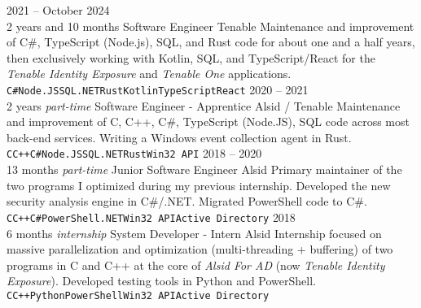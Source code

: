 \documentclass[8pt]{developercv} %
\begin{document}
\begin{entrylist}
	\entry
		{2021 -- October 2024\\\footnotesize{2 years and 10 months}}
		{Software Engineer}
		{Tenable}
		{
			Maintenance and improvement of C\#, TypeScript (Node.js), SQL, and Rust code for about one and a half years, then exclusively working with Kotlin,
			SQL, and TypeScript/React for the \emph{Tenable Identity Exposure} and \emph{Tenable One} applications.\\
			\texttt{C\#}\slashsep\texttt{Node.JS}\slashsep\texttt{SQL}\slashsep\texttt{.NET}\slashsep\texttt{Rust}\slashsep\texttt{Kotlin}\slashsep\texttt{TypeScript}\slashsep\texttt{React}
		}
	\entry
		{2020 -- 2021\\\footnotesize{2 years \emph{part-time}}}
		{Software Engineer - Apprentice}
		{Alsid / Tenable}
		{
			Maintenance and improvement of C, C++, C\#, TypeScript (Node.JS), SQL code across most back-end services. Writing a Windows event collection agent in Rust\footnotemark[1].\\
			\texttt{C}\slashsep\texttt{C++}\slashsep\texttt{C\#}\slashsep\texttt{Node.JS}\slashsep\texttt{SQL}\slashsep\texttt{.NET}\slashsep\texttt{Rust}\slashsep\texttt{Win32 API}
		}
	\entry
		{2018 -- 2020\\\footnotesize{13 months \emph{part-time}}}
		{Junior Software Engineer}
		{Alsid}
		{
			Primary maintainer of the two programs I optimized during my previous internship. Developed the new security analysis engine in C\#/.NET. Migrated PowerShell code to C\#.\\
			\texttt{C}\slashsep\texttt{C++}\slashsep\texttt{C\#}\slashsep\texttt{PowerShell}\slashsep\texttt{.NET}\slashsep\texttt{Win32 API}\slashsep\texttt{Active Directory}
		}
	\entry
		{2018\\\footnotesize{6 months \emph{internship}}}
		{System Developer  - Intern}
		{Alsid}
		{
			Internship focused on massive parallelization and optimization (multi-threading + buffering) of two programs in C and C++ at the core of \emph{Alsid For AD} (now \emph{Tenable Identity Exposure}).
			Developed testing tools in Python and PowerShell.\\
			\texttt{C}\slashsep\texttt{C++}\slashsep\texttt{Python}\slashsep\texttt{PowerShell}\slashsep\texttt{Win32 API}\slashsep\texttt{Active Directory}
		}
\end{entrylist}

\vfill %
\end{document}
